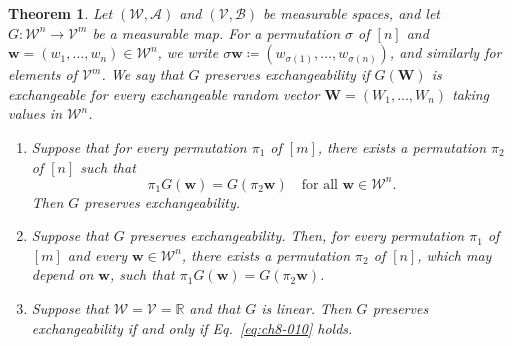 \documentclass[a4paper,12pt]{article}
\numberwithin{equation}{section}
\theoremstyle{plain}
\newtheorem{theorem}{Theorem}[section]
\theoremstyle{definition}
\theoremstyle{remark}
\begin{document}
\begin{theorem}
\label{theorem:ch8-15}
    Let $(\mathcal{W},\mathcal{A})$ and $(\mathcal{V},\mathcal{B})$ be measurable spaces, and let $G:\mathcal{W}^n\to\mathcal{V}^m$ be a measurable map. For a permutation $\sigma$ of $[n]$ and $\bm{w}=(w_1,\dots,w_n)\in\mathcal{W}^n$, we write $\sigma\bm{w}\coloneqq(w_{\sigma(1)},\dots,w_{\sigma(n)})$, and similarly for elements of $\mathcal{V}^m$. We say that $G$ \emph{preserves exchangeability} if $G(\bm{W})$ is exchangeable for every exchangeable random vector $\bm{W}=(W_1,\dots,W_n)$ taking values in $\mathcal{W}^n$.
    \begin{enumerate}
        \item Suppose that for every permutation $\pi_1$ of $[m]$, there exists a permutation $\pi_2$ of $[n]$ such that
        \begin{equation}
            \pi_1 G(\bm{w}) = G(\pi_2\bm{w})\quad\text{for all } \bm{w}\in\mathcal{W}^n.
            \label{eq:ch8-010}
        \end{equation}
        Then $G$ preserves exchangeability.
        \item Suppose that $G$ preserves exchangeability. Then, for every permutation $\pi_1$ of $[m]$ and every $\bm{w}\in\mathcal{W}^n$, there exists a permutation $\pi_2$ of $[n]$, which may depend on $\bm{w}$, such that $\pi_1 G(\bm{w}) = G(\pi_2\bm{w})$.
        \item Suppose that $\mathcal{W}=\mathcal{V}=\mathbb{R}$ and that $G$ is linear. Then $G$ preserves exchangeability if and only if Eq.~\eqref{eq:ch8-010} holds.
    \end{enumerate}
\end{theorem}
\end{document}
